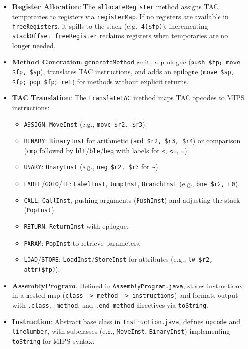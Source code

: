 \documentclass[11pt, titlepage]{article}
\begin{document}
\begin{itemize}[leftmargin=*]
    \item \textbf{Register Allocation}: The \texttt{allocateRegister} method assigns TAC temporaries to registers via \texttt{registerMap}. If no registers are available in \texttt{freeRegisters}, it spills to the stack (e.g., \texttt{4(\$fp)}), incrementing \texttt{stackOffset}. \texttt{freeRegister} reclaims registers when temporaries are no longer needed.
    \item \textbf{Method Generation}: \texttt{generateMethod} emits a prologue (\texttt{push \$fp; move \$fp, \$sp}), translates TAC instructions, and adds an epilogue (\texttt{move \$sp, \$fp; pop \$fp; ret}) for methods without explicit returns.
    \item \textbf{TAC Translation}: The \texttt{translateTAC} method maps TAC opcodes to MIPS instructions:
        \begin{itemize}
            \item \texttt{ASSIGN}: \texttt{MoveInst} (e.g., \texttt{move \$r2, \$r3}).
            \item \texttt{BINARY}: \texttt{BinaryInst} for arithmetic (\texttt{add \$r2, \$r3, \$r4}) or comparison (\texttt{cmp} followed by \texttt{blt}/\texttt{ble}/\texttt{beq} with labels for \texttt{<}, \texttt{<=}, \texttt{=}).
            \item \texttt{UNARY}: \texttt{UnaryInst} (e.g., \texttt{neg \$r2, \$r3} for \texttt{\textasciitilde}).
            \item \texttt{LABEL}/\texttt{GOTO}/\texttt{IF}: \texttt{LabelInst}, \texttt{JumpInst}, \texttt{BranchInst} (e.g., \texttt{bne \$r2, L0}).
            \item \texttt{CALL}: \texttt{CallInst}, pushing arguments (\texttt{PushInst}) and adjusting the stack (\texttt{PopInst}).
            \item \texttt{RETURN}: \texttt{ReturnInst} with epilogue.
            \item \texttt{PARAM}: \texttt{PopInst} to retrieve parameters.
            \item \texttt{LOAD}/\texttt{STORE}: \texttt{LoadInst}/\texttt{StoreInst} for attributes (e.g., \texttt{lw \$r2, attr(\$fp)}).
        \end{itemize}
    \item \textbf{AssemblyProgram}: Defined in \texttt{AssemblyProgram.java}, stores instructions in a nested map (\texttt{class -> method -> instructions}) and formats output with \texttt{.class}, \texttt{.method}, and \texttt{.end\_method} directives via \texttt{toString}.
    \item \textbf{Instruction}: Abstract base class in \texttt{Instruction.java}, defines \texttt{opcode} and \texttt{lineNumber}, with subclasses (e.g., \texttt{MoveInst}, \texttt{BinaryInst}) implementing \texttt{toString} for MIPS syntax.
\end{itemize}
\end{document}
